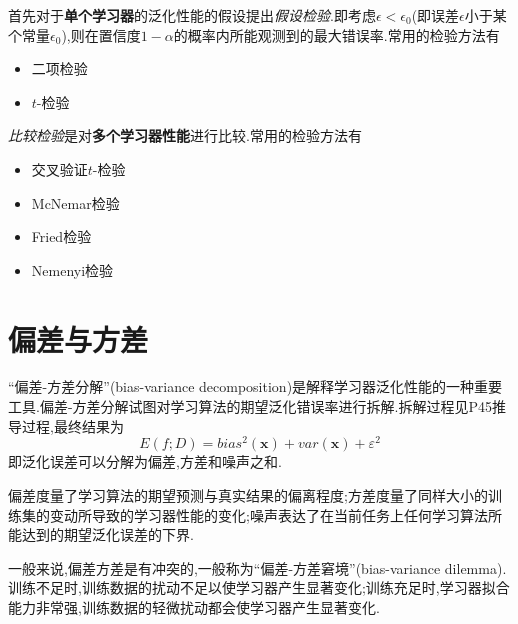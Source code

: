 首先对于\textbf{单个学习器}的泛化性能的假设提出\textit{假设检验}.即考虑$\epsilon<\epsilon_0$(即误差$\epsilon$小于某个常量$\epsilon_0$),则在置信度$1-\alpha$的概率内所能观测到的最大错误率.常用的检验方法有
\begin{itemize}
    \item 二项检验
    \item $t$-检验
\end{itemize}

\textit{比较检验}是对\textbf{多个学习器性能}进行比较.常用的检验方法有
\begin{itemize}
    \item 交叉验证$t$-检验
    \item McNemar检验
    \item Fried检验
    \item Nemenyi检验
\end{itemize}

\section{偏差与方差}

``偏差-方差分解''(bias-variance decomposition)是解释学习器泛化性能的一种重要工具.偏差-方差分解试图对学习算法的期望泛化错误率进行拆解.拆解过程见P45推导过程,最终结果为
\begin{equation}
E(f;D)=bias^2(\mathbf x)+var(\mathbf x)+\varepsilon^2
\end{equation}
即泛化误差可以分解为偏差,方差和噪声之和.

偏差度量了学习算法的期望预测与真实结果的偏离程度;方差度量了同样大小的训练集的变动所导致的学习器性能的变化;噪声表达了在当前任务上任何学习算法所能达到的期望泛化误差的下界.

一般来说,偏差方差是有冲突的,一般称为``偏差-方差窘境''(bias-variance dilemma).训练不足时,训练数据的扰动不足以使学习器产生显著变化;训练充足时,学习器拟合能力非常强,训练数据的轻微扰动都会使学习器产生显著变化.